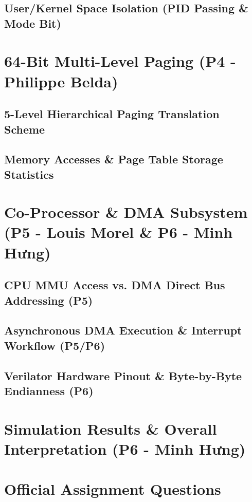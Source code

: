\documentclass[11pt,a4paper]{article}
\begin{document}
\subsection{User/Kernel Space Isolation (PID Passing \& Mode Bit)}

\section{64-Bit Multi-Level Paging (P4 - Philippe Belda)}
\subsection{5-Level Hierarchical Paging Translation Scheme}

\subsection{Memory Accesses \& Page Table Storage Statistics}

\section{Co-Processor \& DMA Subsystem (P5 - Louis Morel \& P6 - Minh Hưng)}
\subsection{CPU MMU Access vs. DMA Direct Bus Addressing (P5)}

\subsection{Asynchronous DMA Execution \& Interrupt Workflow (P5/P6)}

\subsection{Verilator Hardware Pinout \& Byte-by-Byte Endianness (P6)}

\section{Simulation Results \& Overall Interpretation (P6 - Minh Hưng)}

\section{Official Assignment Questions}
\end{document}
